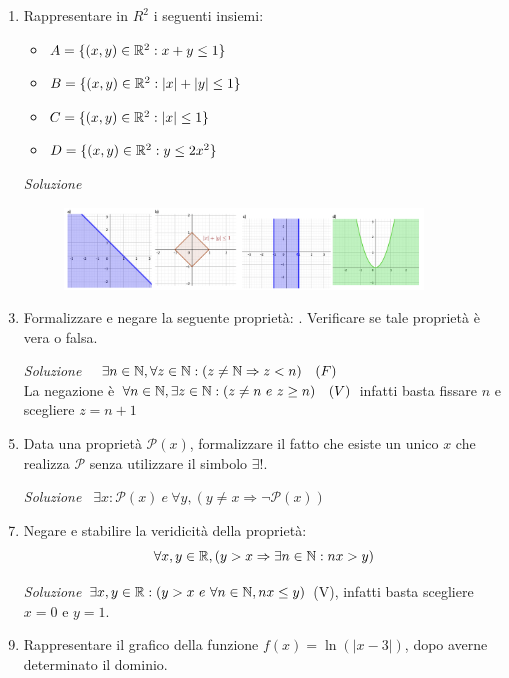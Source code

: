 \documentclass{article}
\begin{document}
\begin{enumerate}[label=\textbf{Esercizio 1.\arabic*.},itemindent=*]
    
    \item Rappresentare in $R^2$ i seguenti insiemi:
    \begin{itemize}
        \item $A=\{(x,y)\in \mathbb{R}^2:x+y\leq1\}$
        \item $B=\{(x,y)\in \mathbb{R}^2:|x|+|y|\leq 1\}$
        \item $C=\{(x,y)\in \mathbb{R}^2: |x|\leq 1\}$
        \item $D=\{(x,y)\in \mathbb{R}^2: y\leq 2x^2\}$
    \end{itemize}
    \item[\textit{\large Soluzione}]~
    \begin{figure}[h]
        \centering
        \includegraphics[width=0.9\textwidth]{Es2.png}
    \end{figure}
    \item Formalizzare e negare la seguente proprietà: . Verificare se tale proprietà è vera o falsa.
    \item[\textit{\large Soluzione}]~ $\exists n\in \mathbb{N} ,\forall z\in \mathbb{N}:( z\neq \mathbb{N}\Rightarrow z<n)~~~(F)$\\
    La negazione è $\forall n\in \mathbb{N},\exists z \in \mathbb{N} :(z\neq n~e~ z\geq n)~~~(V)$ infatti basta fissare $n$ e scegliere $z=n+1$
    \item Data una proprietà $\mathcal{P}(x)$, formalizzare il fatto che esiste un unico $x$ che realizza $\mathcal{P}$ senza utilizzare il simbolo $\exists!$.
    \item[\textit{\large Soluzione~}]
    $\exists x:\mathcal{P}(x)~e~ \forall y,(y\neq x\Rightarrow\lnot \mathcal{P}(x))$
    \item Negare e stabilire la veridicità della proprietà: \[\forall x,y \in \mathbb{R},(y>x\Rightarrow \exists n \in \mathbb{N}: n x>y)\]
    \item[\textit{\large Soluzione}]
    $\exists x,y \in \mathbb{R}:(y>x ~e~ \forall n \in \mathbb{N}, nx\leq y)$ (V), infatti basta scegliere $x=0$ e $y=1$.
    \item Rappresentare il grafico della funzione $f(x)=\ln(|x-3|)$, dopo averne determinato il dominio.

\end{enumerate}
\end{document}
